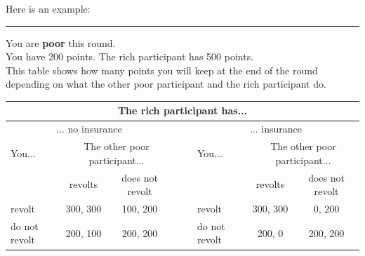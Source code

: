 \documentclass[12pt]{article}
\begin{document}
	Here is an example:
	
	\noindent\rule[0.5ex]{\linewidth}{1pt}
		You are \textbf{poor} this round.\\		
		You have 200 points. The rich participant has 500 points.\\		
		This table shows how many points you will keep at the end of the round 
		depending on what the other poor participant and the rich participant 
		do.
		
	\begin{adjustwidth*}{-2cm}{-2cm}
		\centering
		\begin{tabular}{l|c|c|c|cl|c|c|}
			\multicolumn{8}{c}{The rich participant has...}\\
			\hline
			\multicolumn{3}{c}{... no insurance} && \multicolumn{1}{c}{}&
			\multicolumn{3}{c}{... insurance}\\
			You... &\multicolumn{2}{c}{The other poor participant...} 
			&&  & You...
			&\multicolumn{2}{c}{The other poor participant...}\\
			\cline{1-3}\cline{6-8}
			& revolts & does not revolt &&&& revolts & does not 
			revolt\\
			\cline{2-3}\cline{7-8}
			revolt & 300, 300 & 100, 200 &&& revolt & 300, 300 & 0, 200\\
			\cline{1-3}\cline{6-8}
			do not revolt & 200, 100 & 200, 200 &&& do not revolt &200, 0 & 
			200, 200\\
			\cline{2-3}\cline{7-8}
		\end{tabular}
	\end{adjustwidth*}
	
\end{document}
